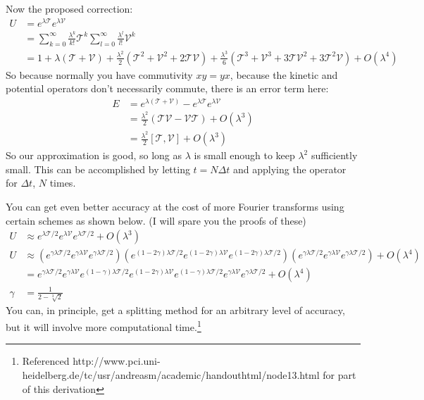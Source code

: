 Now the proposed correction:
\begin{align*}
	U &= e^{\lambda \mathcal{T} } e^{\lambda  \mathcal{V} }  \\
	&= \sum_{k=0}^{\infty} \frac{\lambda^k}{k!} \mathcal{T}^k \sum_{l=0}^{\infty} \frac{\lambda^l}{l!} \mathcal{V}^k \\
	&= 1 + \lambda (\mathcal{T} + \mathcal{V}) + \frac{\lambda^2}{2}(\mathcal{T}^2 + \mathcal{V}^2 + 2 \mathcal{T} \mathcal{V}) + \frac{\lambda^3}{6}(\mathcal{T}^3 + \mathcal{V}^3  + 3\mathcal{T}\mathcal{V}^2 + 3\mathcal{T}^2 \mathcal{V}  ) + O(\lambda^4)
\end{align*}
So because normally you have commutivity $xy = yx$, because the kinetic and potential operators don't necessarily commute, there is an error term here:
\begin{align*}
	E &=  e^{\lambda (\mathcal{T} + \mathcal{V} ) } - e^{\lambda \mathcal{T} } e^{\lambda  \mathcal{V} }  \\
	&= \frac{\lambda^2}{2} ( \mathcal{T} \mathcal{V} - \mathcal{V} \mathcal{T} ) + O(\lambda^3) \\
	&= \frac{\lambda^2}{2} [ \mathcal{T}, \mathcal{V}] + O(\lambda^3)
\end{align*}
So our approximation is good, so long as $\lambda$ is small enough to keep $\lambda^2$ sufficiently small.  This can be accomplished by letting $t=N\Delta t$ and applying the operator for $\Delta t$, $N$ times.

You can get even better accuracy at the cost of more Fourier transforms using certain schemes as shown below.  (I will spare you the proofs of these)
\begin{align*}
	U &\approx e^{\lambda \mathcal{T} / 2 } e^{\lambda  \mathcal{V} } e^{\lambda \mathcal{T} / 2 } + O(\lambda^3) \\
	U &\approx \left(  e^{\gamma \lambda \mathcal{T} / 2 } e^{\gamma \lambda  \mathcal{V} } e^{\gamma \lambda \mathcal{T} / 2 } \right) \left( e^{(1- 2\gamma) \lambda \mathcal{T} / 2 } e^{(1- 2\gamma) \lambda  \mathcal{V} } e^{(1- 2\gamma) \lambda \mathcal{T} / 2 } \right) \left( e^{\gamma \lambda \mathcal{T} / 2 } e^{\gamma \lambda  \mathcal{V} } e^{\gamma \lambda \mathcal{T} / 2 } \right)+ O(\lambda^4) \\
	&= e^{\gamma \lambda \mathcal{T} / 2 } e^{\gamma \lambda  \mathcal{V} } e^{(1-\gamma) \lambda \mathcal{T} / 2 } e^{(1- 2\gamma) \lambda  \mathcal{V} } e^{(1-\gamma) \lambda \mathcal{T} / 2 }  e^{\gamma \lambda  \mathcal{V} } e^{\gamma \lambda \mathcal{T} / 2 } + O(\lambda^4) \\
	\gamma &= \frac{1}{2 - \sqrt[3]{2}}
\end{align*}
You can, in principle, get a splitting method for an arbitrary level of accuracy, but it will involve more computational time.\footnote{Referenced http://www.pci.uni-heidelberg.de/tc/usr/andreasm/academic/handouthtml/node13.html for part of this derivation}

